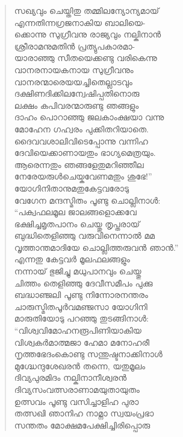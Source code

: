 \begin{verse}
സഖ്യവും ചെയ്തിതു തമ്മിലന്യോന്യമായ്\\
എന്നതിന്നഗ്രജനാകിയ ബാലിയെ-\\
ക്കൊന്നു സുഗ്രീവനു രാജ്യവും നല്കിനാന്‍\\
ശ്രീരാമനുമതിന്‍ പ്രത്യുപകാരമാ-\\
യാരാഞ്ഞു സീതയെക്കണ്ടു വരികെന്നു\\
വാനരനായകനായ സുഗ്രീവനും\\
വാനരന്മാരെയയച്ചിതെല്ലാടവും\\
ദക്ഷിണദിക്കിലന്വേഷിപ്പതിനൊരു\\
ലക്ഷം കപിവരന്മാരുണ്ടു ഞങ്ങളും\\
ദാഹം പൊറാഞ്ഞു ജലകാംക്ഷയാ വന്നു\\
മോഹേന ഗഹ്വരം പുക്കിതറിയാതെ.\\
ദൈവവശാലിവിടെപ്പോന്നു വന്നിഹ\\
ദേവിയെക്കാണായതും ഭാഗ്യമെത്രയും.\\
ആരെന്നതും ഞങ്ങളേതുമറിഞ്ഞീല\\
നേരേയരുള്‍ചെയ്കവേണമതും ശുഭേ!”\\
യോഗിനിതാനുമതുകേട്ടവരോടു\\
വേഗേന മന്ദസ്മിതം പൂണ്ടു ചൊല്ലിനാള്‍:\\
“പക്വഫലമൂല ജാലങ്ങളൊക്കവേ\\
ഭക്ഷിച്ചമൃതപാനം ചെയ്തു തൃപ്തരായ്\\
ബുദ്ധിതെളിഞ്ഞു വരുവിനെന്നാല്‍ മമ\\
വൃത്താന്തമാദിയേ ചൊല്ലിത്തരുവന്‍ ഞാന്‍.”\\
എന്നതു കേട്ടവര്‍ മൂലഫലങ്ങളും\\
നന്നായ് ഭുജിച്ചു മധുപാനവും ചെയ്തു\\
ചിത്തം തെളിഞ്ഞു ദേവീസമീപം പുക്കു\\
ബദ്ധാഞ്ജലി പൂണ്ടു നിന്നോരനന്തരം\\
ചാരുസ്മിതപൂര്‍വമഞ്ജസാ യോഗിനി\\
മാരുതിയോടു പറഞ്ഞു തുടങ്ങിനാള്‍:\\
“വിശ്വവിമോഹനരൂപിണിയാകിയ\\
വിശ്വകര്‍മാത്മജാ ഹേമാ മനോഹരീ\\
നൃത്തഭേദംകൊണ്ടു സന്തുഷ്ടനാക്കിനാള്‍\\
മുഗ്ദ്ധേന്ദുശേഖരന്‍ തന്നെ, യതുമൂലം\\
ദിവ്യപുരമിദം നല്കിനാനീശ്വരന്‍\\
ദിവ്യസംവത്സരാണാമയുതായുതം\\
ഉത്സവം പൂണ്ടു വസിച്ചാളിഹ പുരാ\\
തത്സഖി ഞാനിഹ നാമ്നാ സ്വയംപ്രഭാ\\
സന്തതം മോക്ഷമപേക്ഷിച്ചിരിപ്പൊരു\\

\end{verse}

